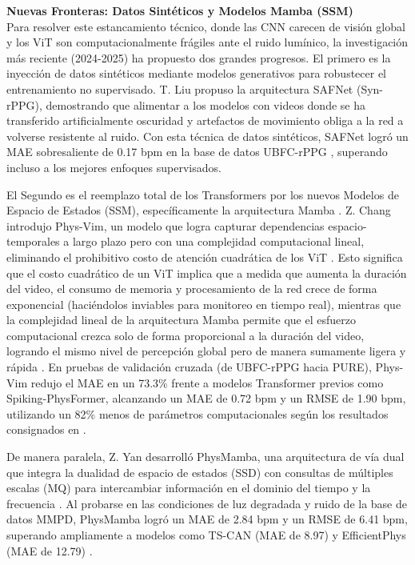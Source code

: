 \textbf{Nuevas Fronteras: Datos Sintéticos y Modelos Mamba (SSM)}\\

Para resolver este estancamiento técnico, donde las CNN carecen de visión global y los ViT son computacionalmente frágiles ante el ruido lumínico, la 
investigación más reciente (2024-2025) ha propuesto dos grandes progresos.
El primero es la inyección de datos sintéticos mediante modelos generativos para robustecer el entrenamiento no supervisado. T. Liu propuso la arquitectura 
SAFNet (Syn-rPPG), demostrando que alimentar a los modelos con videos donde se ha transferido artificialmente oscuridad y artefactos de movimiento obliga a la 
red a volverse resistente al ruido. Con esta técnica de datos sintéticos, SAFNet logró un MAE sobresaliente de 0.17 bpm en la base de datos UBFC-rPPG \cite{liu2025synrppg}, superando 
incluso a los mejores enfoques supervisados.

El Segundo es el reemplazo total de los Transformers por los nuevos Modelos de Espacio de Estados (SSM), específicamente la arquitectura Mamba \cite{chang2025physvim, yan2025physmamba}. 
Z. Chang introdujo Phys-Vim, un modelo que logra capturar dependencias espacio-temporales a largo plazo pero con una complejidad computacional lineal, eliminando 
el prohibitivo costo de atención cuadrática de los ViT \cite{chang2025physvim}. Esto significa que el costo cuadrático de un ViT implica que a medida que aumenta la duración del 
video, el consumo de memoria y procesamiento de la red crece de forma exponencial (haciéndolos inviables para monitoreo en tiempo real), mientras que la 
complejidad lineal de la arquitectura Mamba permite que el esfuerzo computacional crezca solo de forma proporcional a la duración del video, logrando el mismo 
nivel de percepción global pero de manera sumamente ligera y rápida \cite{chang2025physvim}. En pruebas de validación cruzada (de UBFC-rPPG hacia PURE), Phys-Vim redujo el MAE en un 73.3\% frente a modelos Transformer previos como Spiking-PhysFormer, alcanzando un MAE de 0.72 bpm y un RMSE de 1.90 bpm, utilizando un 82\% menos de 
parámetros computacionales según los resultados consignados en \cite{chang2025physvim}.

De manera paralela, Z. Yan desarrolló PhysMamba, una arquitectura de vía dual que integra la dualidad de espacio de estados (SSD) con consultas de múltiples 
escalas (MQ) para intercambiar información en el dominio del tiempo y la frecuencia \cite{yan2025physmamba}. Al probarse en las condiciones de luz degradada y ruido de la base de datos 
MMPD, PhysMamba logró un MAE de 2.84 bpm y un RMSE de 6.41 bpm, superando ampliamente a modelos como TS-CAN (MAE de 8.97) y EfficientPhys (MAE de 12.79) \cite{yan2025physmamba}.


